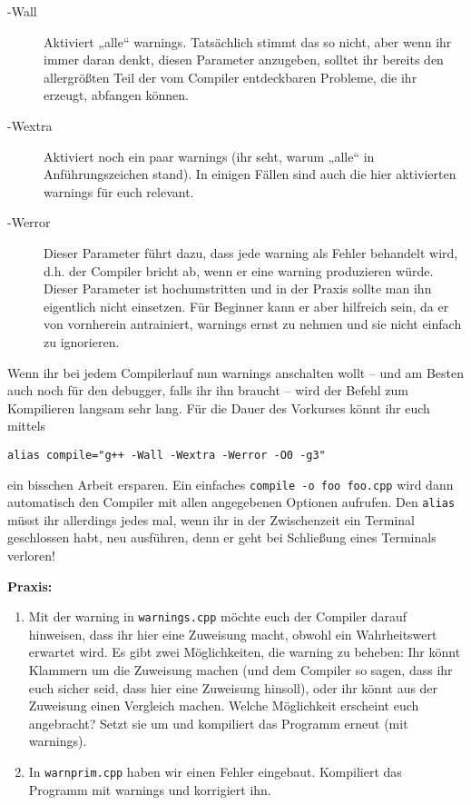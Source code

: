 \begin{description}
    \item[-Wall]
        Aktiviert „alle“ warnings. Tatsächlich stimmt das so nicht, aber wenn
        ihr immer daran denkt, diesen Parameter anzugeben, solltet ihr bereits
        den allergrößten Teil der vom Compiler entdeckbaren Probleme, die ihr
        erzeugt, abfangen können.
    \item[-Wextra]
        Aktiviert noch ein paar warnings (ihr seht, warum „alle“ in
        Anführungszeichen stand). In einigen Fällen sind auch die hier
        aktivierten warnings für euch relevant.
    \item[-Werror]
        Dieser Parameter führt dazu, dass jede warning als Fehler behandelt
        wird, d.h. der Compiler bricht ab, wenn er eine warning produzieren
        würde. Dieser Parameter ist hochumstritten und in der Praxis sollte man
        ihn eigentlich nicht einsetzen. Für Beginner kann er aber hilfreich
        sein, da er von vornherein antrainiert, warnings ernst zu nehmen und
        sie nicht einfach zu ignorieren.
\end{description}

Wenn ihr bei jedem Compilerlauf nun warnings anschalten wollt -- und am Besten auch noch für den debugger, falls ihr ihn braucht -- wird der Befehl zum Kompilieren langsam sehr lang. Für die Dauer des Vorkurses könnt ihr euch mittels

\texttt{alias compile="g++ -Wall -Wextra -Werror -O0 -g3"}

ein bisschen Arbeit ersparen. Ein einfaches \texttt{compile -o foo foo.cpp}
wird dann automatisch den Compiler mit allen angegebenen Optionen aufrufen. Den
\texttt{alias} müsst ihr allerdings jedes mal, wenn ihr in der Zwischenzeit ein
Terminal geschlossen habt, neu ausführen, denn er geht bei Schließung eines
Terminals verloren!

\textbf{Praxis:}
\begin{enumerate}
    \item Mit der warning in \texttt{warnings.cpp} möchte euch der Compiler
        darauf hinweisen, dass ihr hier eine Zuweisung macht, obwohl ein
        Wahrheitswert erwartet wird. Es gibt zwei Möglichkeiten, die warning zu
        beheben: Ihr könnt Klammern um die Zuweisung machen (und dem Compiler
        so sagen, dass ihr euch sicher seid, dass hier eine Zuweisung hinsoll),
        oder ihr könnt aus der Zuweisung einen Vergleich machen. Welche
        Möglichkeit erscheint euch angebracht? Setzt sie um und kompiliert das
        Programm erneut (mit warnings).
    \item In \texttt{warnprim.cpp} haben wir einen Fehler eingebaut. Kompiliert
        das Programm mit warnings und korrigiert ihn.
\end{enumerate}

